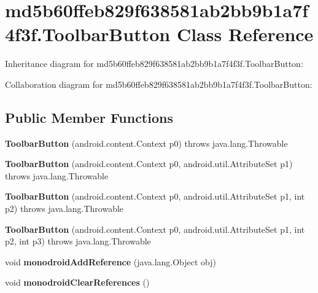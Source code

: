 \hypertarget{classmd5b60ffeb829f638581ab2bb9b1a7f4f3f_1_1_toolbar_button}{}\section{md5b60ffeb829f638581ab2bb9b1a7f4f3f.\+Toolbar\+Button Class Reference}
\label{classmd5b60ffeb829f638581ab2bb9b1a7f4f3f_1_1_toolbar_button}


Inheritance diagram for md5b60ffeb829f638581ab2bb9b1a7f4f3f.\+Toolbar\+Button\+:


Collaboration diagram for md5b60ffeb829f638581ab2bb9b1a7f4f3f.\+Toolbar\+Button\+:
\subsection*{Public Member Functions}
\begin{DoxyCompactItemize}
\item 
\mbox{\label{classmd5b60ffeb829f638581ab2bb9b1a7f4f3f_1_1_toolbar_button_a3c5b1d6dde9df6e1f5c4364406222cd1}} 
{\bfseries Toolbar\+Button} (android.\+content.\+Context p0)  throws java.\+lang.\+Throwable 	
\item 
\mbox{\label{classmd5b60ffeb829f638581ab2bb9b1a7f4f3f_1_1_toolbar_button_aba93a3ac87dc10f5713a4882c68fee02}} 
{\bfseries Toolbar\+Button} (android.\+content.\+Context p0, android.\+util.\+Attribute\+Set p1)  throws java.\+lang.\+Throwable 	
\item 
\mbox{\label{classmd5b60ffeb829f638581ab2bb9b1a7f4f3f_1_1_toolbar_button_ad5e43fe6b0e4f51252d4391663d59e82}} 
{\bfseries Toolbar\+Button} (android.\+content.\+Context p0, android.\+util.\+Attribute\+Set p1, int p2)  throws java.\+lang.\+Throwable 	
\item 
\mbox{\label{classmd5b60ffeb829f638581ab2bb9b1a7f4f3f_1_1_toolbar_button_aaae2da423d7cf4bca5554637f07037c8}} 
{\bfseries Toolbar\+Button} (android.\+content.\+Context p0, android.\+util.\+Attribute\+Set p1, int p2, int p3)  throws java.\+lang.\+Throwable 	
\item 
\mbox{\label{classmd5b60ffeb829f638581ab2bb9b1a7f4f3f_1_1_toolbar_button_af05d5521378aa2cb4172b52389931500}} 
void {\bfseries monodroid\+Add\+Reference} (java.\+lang.\+Object obj)
\item 
\mbox{\label{classmd5b60ffeb829f638581ab2bb9b1a7f4f3f_1_1_toolbar_button_ac9d5767f28660a403f0a190266bd2b40}} 
void {\bfseries monodroid\+Clear\+References} ()
\end{DoxyCompactItemize}
